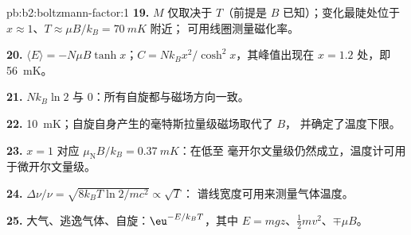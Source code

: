 \begin{solution}{pb:b2:boltzmann-factor:1}
\textbf{19.} $M$ 仅取决于 $T$（前提是 $B$ 已知）；变化最陡处位于
$x \approx 1$、$T \approx \mu B/k_B = \qty{70}{mK}$ 附近；
可用线圈测量磁化率。

\textbf{20.} $\langle E\rangle = -N\mu B\tanh x$；$C = Nk_Bx^2/\cosh^2x$，其峰值出现在
$x = 1.2$ 处，即 \qty{56}{mK}。

\textbf{21.} $Nk_B\ln 2$ 与 $0$：所有自旋都与磁场方向一致。

\textbf{22.} \qty{10}{mK}；自旋自身产生的毫特斯拉量级磁场取代了 $B$，
并确定了温度下限。

\textbf{23.} $x = 1$ 对应 $\mu_{\text{N}}B/k_B = \qty{0.37}{mK}$：在低至
毫开尔文量级仍然成立，温度计可用于微开尔文量级。

\textbf{24.} $\Delta\nu/\nu = \sqrt{8k_BT\ln2/mc^2} \propto \sqrt T$：
谱线宽度可用来测量气体温度。

\textbf{25.} 大气、逃逸气体、自旋：$\eu^{-E/k_BT}$，其中
$E = mgz$、$\tfrac12mv^2$、$\mp\mu B$。
\end{solution}
